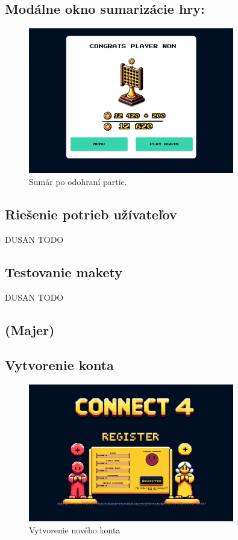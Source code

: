 \documentclass[a4paper, 11pt, onecolumn]{article}
\begin{document}
\subsection*{Modálne okno sumarizácie hry:}
\begin{figure}[H]
  \centering
  \includegraphics[width=0.8\textwidth]{Vyhra.png}
  \caption{ Sumár po odohraní partie.}
  \label{fig:sumár_label}
\end{figure}
\subsection*{Riešenie potrieb užívateľov}
DUSAN TODO
\subsection{Testovanie makety}
DUSAN TODO


\subsection{(Majer)}
\subsection*{Vytvorenie konta}
\begin{figure}[H]
  \centering
  \includegraphics[width=0.8\textwidth]{Register.png}
  \caption{Vytvorenie nového konta}
  \label{fig:register}
\end{figure}
\end{document}
